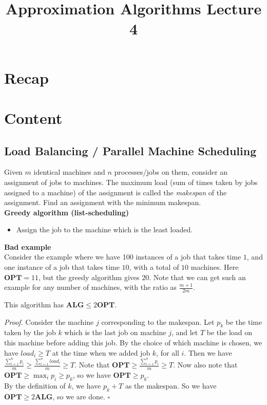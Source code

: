 \documentclass[a4paper]{article}
\title{\textbf{Approximation Algorithms Lecture 4}}
\date{}
\newenvironment{proof}{\begin{breakbox}\textit{Proof.}}{\hfill$\square$\end{breakbox}}
\newcommand{\nl}{\vspace{0.2cm}\\}
\newcommand{\OPT}{\mathbf{OPT}}
\newcommand{\ALG}{\mathbf{ALG}}
\begin{document}
\maketitle
\tableofcontents

\section{Recap}

\section{Content}

\subsection{Load Balancing / Parallel Machine Scheduling}

Given $m$ identical machines and $n$ processes/jobs on them, consider an assignment of jobs to machines. The maximum load (sum of times taken by jobs assigned to a machine) of the assignment is
called the \emph{makespan} of the assignment. Find an assignment with the minimum makespan.\nl

\textbf{Greedy algorithm (list-scheduling)}
\begin{itemize}
    \item Assign the job to the machine which is the least loaded.
\end{itemize}

\textbf{Bad example}\nl
Consider the example where we have 100 instances of a job that takes time $1$, and one instance of a job that takes time $10$, with a total of $10$ machines. Here $\OPT = 11$, but the greedy
algorithm gives $20$. Note that we can get such an example for any number of machines, with the ratio as $\frac{m + 1}{2m}$.\nl

\begin{claim}
    This algorithm has $\ALG \le 2 \OPT$.
\end{claim}

\begin{proof}
    Consider the machine $j$ corresponding to the makespan. Let $p_k$ be the time taken by the job $k$ which is the last job on machine $j$, and let $T$ be the load on this machine before adding this job. By the
    choice of which machine is chosen, we have $load_i \ge T$ at the time when we added job $k$, for all $i$. Then we have $\frac{\sum_{i=1}^n p_i}{m} \ge \frac{\sum_{i=1}^n load_i}{m} \ge T$. Note that $\OPT \ge \frac{\sum_{i=1}^n
    p_i}{m} \ge T$.
    Now also note that $\OPT \ge \max_i p_i \ge p_k$, so we have $\OPT \ge p_k$.\nl
    By the definition of $k$, we have $p_k + T$ as the makespan. So we have $\OPT \ge 2 \ALG$, so we are done.
\end{proof}
\end{document}
